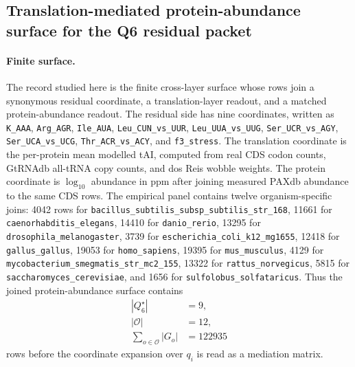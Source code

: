 \subsection{Translation-mediated protein-abundance surface for the Q6 residual packet}\label{sec:q6-translation-mediated-protein-abundance-cross-layer}

\paragraph{Finite surface.}
The record studied here is the finite cross-layer surface whose rows join a synonymous residual coordinate, a translation-layer readout, and a matched protein-abundance readout.  The residual side has nine coordinates, written as \texttt{K\_AAA}, \texttt{Arg\_AGR}, \texttt{Ile\_AUA}, \texttt{Leu\_CUN\_vs\_UUR}, \texttt{Leu\_UUA\_vs\_UUG}, \texttt{Ser\_UCR\_vs\_AGY}, \texttt{Ser\_UCA\_vs\_UCG}, \texttt{Thr\_ACR\_vs\_ACY}, and \texttt{f3\_stress}.  The translation coordinate is the per-protein mean modelled tAI, computed from real CDS codon counts, GtRNAdb all-tRNA copy counts, and dos Reis wobble weights.  The protein coordinate is $\log_{10}$ abundance in ppm after joining measured PAXdb abundance to the same CDS rows.  The empirical panel contains twelve organism-specific joins: 4042 rows for \texttt{bacillus\_subtilis\_subsp\_subtilis\_str\_168}, 11661 for \texttt{caenorhabditis\_elegans}, 14410 for \texttt{danio\_rerio}, 13295 for \texttt{drosophila\_melanogaster}, 3739 for \texttt{escherichia\_coli\_k12\_mg1655}, 12418 for \texttt{gallus\_gallus}, 19053 for \texttt{homo\_sapiens}, 19395 for \texttt{mus\_musculus}, 4129 for \texttt{mycobacterium\_smegmatis\_str\_mc2\_155}, 13322 for \texttt{rattus\_norvegicus}, 5815 for \texttt{saccharomyces\_cerevisiae}, and 1656 for \texttt{sulfolobus\_solfataricus}.  Thus the joined protein-abundance surface contains
$$\begin{aligned}
|Q^{\star}_{6}| &= 9,\\
|\mathcal O| &= 12,\\
\sum_{o\in\mathcal O} |G_o| &= 122935
\end{aligned}$$
rows before the coordinate expansion over $q_i$ is read as a mediation matrix.

